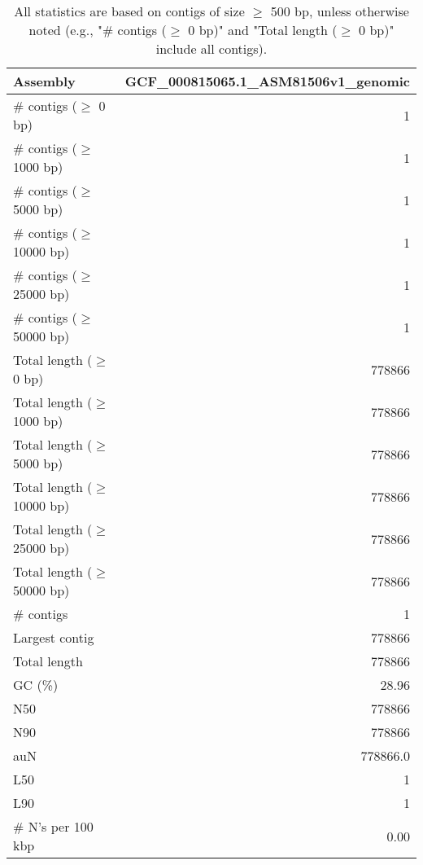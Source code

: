 \documentclass[12pt,a4paper]{article}
\begin{document}
\begin{table}[ht]
\begin{center}
\caption{All statistics are based on contigs of size $\geq$ 500 bp, unless otherwise noted (e.g., "\# contigs ($\geq$ 0 bp)" and "Total length ($\geq$ 0 bp)" include all contigs).}
\begin{tabular}{|l*{1}{|r}|}
\hline
Assembly & GCF\_000815065.1\_ASM81506v1\_genomic \\ \hline
\# contigs ($\geq$ 0 bp) & 1 \\ \hline
\# contigs ($\geq$ 1000 bp) & 1 \\ \hline
\# contigs ($\geq$ 5000 bp) & 1 \\ \hline
\# contigs ($\geq$ 10000 bp) & 1 \\ \hline
\# contigs ($\geq$ 25000 bp) & 1 \\ \hline
\# contigs ($\geq$ 50000 bp) & 1 \\ \hline
Total length ($\geq$ 0 bp) & 778866 \\ \hline
Total length ($\geq$ 1000 bp) & 778866 \\ \hline
Total length ($\geq$ 5000 bp) & 778866 \\ \hline
Total length ($\geq$ 10000 bp) & 778866 \\ \hline
Total length ($\geq$ 25000 bp) & 778866 \\ \hline
Total length ($\geq$ 50000 bp) & 778866 \\ \hline
\# contigs & 1 \\ \hline
Largest contig & 778866 \\ \hline
Total length & 778866 \\ \hline
GC (\%) & 28.96 \\ \hline
N50 & 778866 \\ \hline
N90 & 778866 \\ \hline
auN & 778866.0 \\ \hline
L50 & 1 \\ \hline
L90 & 1 \\ \hline
\# N's per 100 kbp & 0.00 \\ \hline
\end{tabular}
\end{center}
\end{table}
\end{document}
